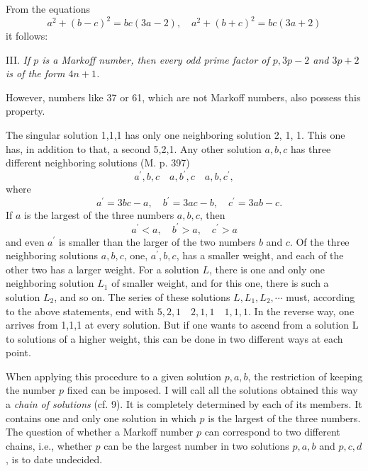 \documentclass[12pt]{article}
\begin{document}
From the equations
\begin{equation*}
a^{2}+(b-c)^{2}=b c(3 a-2), \quad a^{2}+(b+c)^{2}=b c(3 a+2)
\end{equation*}
it follows:

\bigskip

III. \textit{If $p$ is a Markoff number, then every odd prime factor of $p, 3p-2$ and $3p+2$ is of the form $4n+1$.}

\bigskip

However, numbers like 37 or 61, which are not Markoff numbers, also possess this property.

The singular solution 1,1,1 has only one neighboring solution 2, 1, 1. This one has, in addition to that, a second 5,2,1. Any other solution $a, b, c$ has three different neighboring solutions (M. p. 397)
\begin{equation*}
a^{\prime}, b, c \quad a, b^{\prime}, c \quad a, b, c^{\prime},
\end{equation*}
where
\begin{equation*}
\quad a^{\prime}=3 b c-a, \quad b^{\prime}=3 a c-b, \quad c^{\prime}=3 a b-c. \tag{4.}
\end{equation*}
If $a$ is the largest of the three numbers $a, b, c$, then
\begin{equation*}
a^{\prime}<a, \quad b^{\prime}>a, \quad c^{\prime}>a
\end{equation*}
and even $a^{\prime}$ is smaller than the larger of the two numbers $b$ and $c$. Of the three neighboring solutions $a, b, c$, one, $a^{\prime}, b, c$, has a smaller weight, and each of the other two has a larger weight. For a solution $L$, there is one and only one neighboring solution $L_{1}$ of smaller weight, and for this one, there is such a solution $L_{2}$, and so on. The series of these solutions $L, L_{1}, L_{2}, \cdots$ must, according to the above statements, end with $5,2,1 \quad 2,1,1 \quad 1,1,1$. In the reverse way, one arrives from 1,1,1 at every solution. But if one wants to ascend from a solution L to solutions of a higher weight, this can be done in two different ways at each point.

When applying this procedure to a given solution $p, a, b$, the restriction of keeping the number $p$ fixed can be imposed. I will call all the solutions obtained this way a \textit{chain of solutions} (cf. 9). It is completely determined by each of its members. It contains one and only one solution in which $p$ is the largest of the three numbers. The question of whether a Markoff number $p$ can correspond to two different chains, i.e., whether $p$ can be the largest number in two solutions $p, a, b$ and $p, c, d$, is to date undecided.
\end{document}
